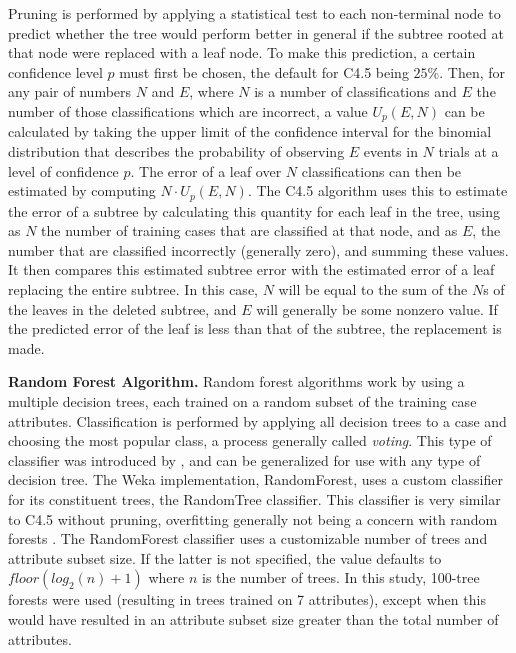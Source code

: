 \documentclass[main.tex]{subfiles}
\begin{document}
Pruning is performed by applying a statistical test to each non-terminal node to predict whether the tree would perform better in general if the subtree rooted at that node were replaced with a leaf node. To make this prediction, a certain confidence level $p$ must first be chosen, the default for C4.5 being $25\%$. Then, for any pair of numbers $N$ and $E$, where $N$ is a number of classifications and $E$ the number of those classifications which are incorrect, a value $U_{p}(E,N)$ can be calculated by taking the upper limit of the confidence interval for the binomial distribution that describes the probability of observing $E$ events in $N$ trials at a level of confidence $p$. The error of a leaf over $N$ classifications can then be estimated by computing $N\cdot U_{p}(E,N)$. The C4.5 algorithm uses this to estimate the error of a subtree by calculating this quantity for each leaf in the tree, using as $N$ the number of training cases that are classified at that node, and as $E$, the number that are classified incorrectly (generally zero), and summing these values. It then compares this estimated subtree error with the estimated error of a leaf replacing the entire subtree. In this case, $N$ will be equal to the sum of the $N$s of the leaves in the deleted subtree, and $E$ will generally be some nonzero value. If the predicted error of the leaf is less than that of the subtree, the replacement is made.

\textbf{Random Forest Algorithm.} Random forest algorithms work by using a multiple decision trees, each trained on a random subset of the training case attributes. Classification is performed by applying all decision trees to a case and choosing the most popular class, a process generally called \textit{voting}. This type of classifier was introduced by \citet{breiman:2001}, and can be generalized for use with any type of decision tree. The Weka implementation, RandomForest, uses a custom classifier for its constituent trees, the RandomTree classifier. This classifier is very similar to C4.5 without pruning, overfitting generally not being a concern with random forests \citep{breiman:2001}. The RandomForest classifier uses a customizable number of trees and attribute subset size. If the latter is not specified, the value defaults to $floor(log_2(n)+1)$ where $n$ is the number of trees. In this study, 100-tree forests were used (resulting in trees trained on 7 attributes), except when this would have resulted in an attribute subset size greater than the total number of attributes.


\biblio
\end{document}
